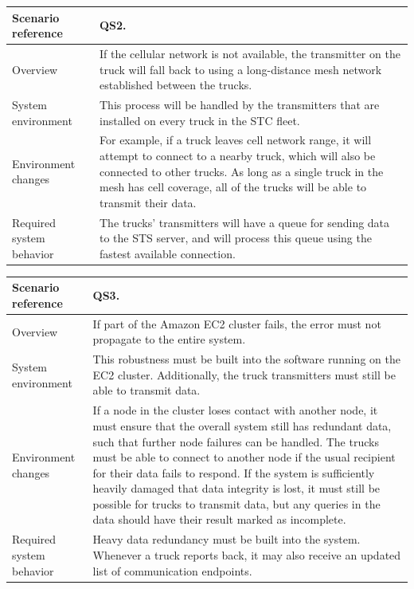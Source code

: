 \documentclass[a4paper,11pt]{report}
\begin{document}
\begin{center}
  \begin{tabular}[h!]{| >{\columncolor{gray}}p{} | p{} |}
    \hline
    Scenario reference & QS2. \\
    \hline
    Overview & If the cellular network is not available, the transmitter on the
    truck will fall back to using a long-distance mesh network established
    between the trucks. \\
    \hline
    System environment & This process will be handled
    by the transmitters that are installed on every truck in the STC fleet.\\
    \hline
    Environment changes & For example, if a truck leaves cell network range, it
    will attempt to connect to a nearby truck, which will also be connected to
    other trucks. As long as a single truck in the mesh has cell coverage, all
    of the trucks will be able to transmit their data.\\
    \hline
    Required system behavior & The trucks' transmitters will have a queue for
    sending data to the STS server, and will process this queue using the
    fastest available connection.\\
    \hline
  \end{tabular}
\end{center}

\begin{center}
  \begin{tabular}[h!]{| >{\columncolor{gray}}p{} | p{} |}
    \hline
    Scenario reference & QS3. \\
    \hline
    Overview & If part of the Amazon EC2 cluster fails, the error must not propagate to the entire system.\\
    \hline
    System environment & This robustness must be built into the software running on the EC2 cluster.  Additionally, the truck transmitters must still be able to transmit data. \\
    \hline
    Environment changes & If a node in the cluster loses contact with another node, it must ensure that the overall system still has redundant data, such that further node failures can be handled.  The trucks must be able to connect to another node if the usual recipient for their data fails to respond.  If the system is sufficiently heavily damaged that data integrity is lost, it must still be possible for trucks to transmit data, but any queries in the data should have their result marked as incomplete.  \\
    \hline
    Required system behavior & Heavy data redundancy must be built into the system.  Whenever a truck reports back, it may also receive an updated list of communication endpoints. \\
    \hline
  \end{tabular}
\end{center}
\end{document}
